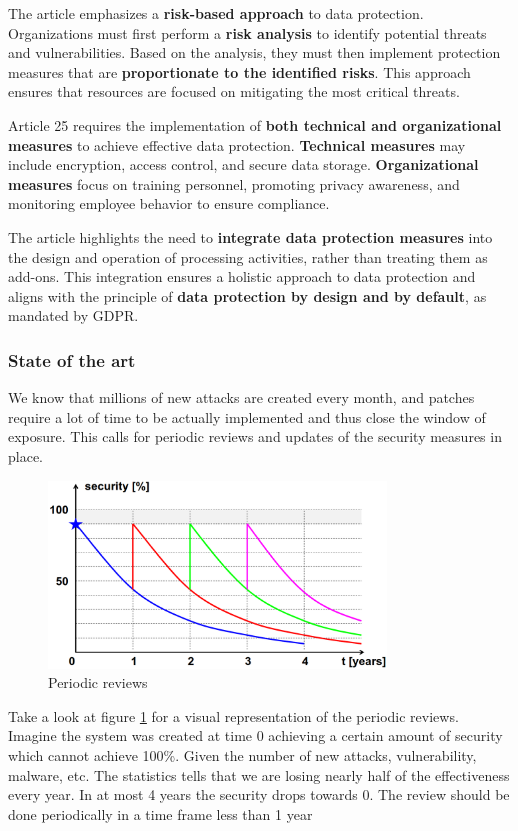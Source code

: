 The article emphasizes a \textbf{risk-based approach} to data
protection. Organizations must first perform a \textbf{risk analysis}
to identify potential threats and vulnerabilities. Based on the
analysis, they must then implement protection measures that are
\textbf{proportionate to the identified risks}. This approach ensures
that resources are focused on mitigating the most critical threats.

Article 25 requires the implementation of \textbf{both technical and
organizational measures} to achieve effective data protection.
\textbf{Technical measures} may include encryption, access control,
and secure data storage.  \textbf{Organizational measures} focus on
training personnel, promoting privacy awareness, and monitoring
employee behavior to ensure compliance.  

The article highlights the need to \textbf{integrate data protection
measures} into the design and operation of processing activities,
rather than treating them as add-ons. This integration ensures a
holistic approach to data protection and aligns with the principle of
\textbf{data protection by design and by default}, as mandated by
GDPR.

\subsubsection{State of the art}
We know that millions of new attacks are created every month, and
patches require a lot of time to be actually implemented and thus
close the window of exposure. This calls for periodic reviews and
updates of the security measures in place.

\begin{figure}[H]
  \centering
  \includegraphics[width=0.8\textwidth]{img/periodic reviews.png}
  \caption{Periodic reviews}
  \label{fig:periodic reviews}
\end{figure}

Take a look at figure \ref{fig:periodic reviews} for a visual
representation of the periodic reviews. Imagine the system was created
at time 0 achieving a certain amount of security which cannot achieve
100\%. Given the number of new attacks, vulnerability, malware, etc.
The statistics tells that we are losing nearly half of the
effectiveness every year. In at most 4 years the security drops
towards 0. The review should be done periodically in a time frame less
than 1 year

